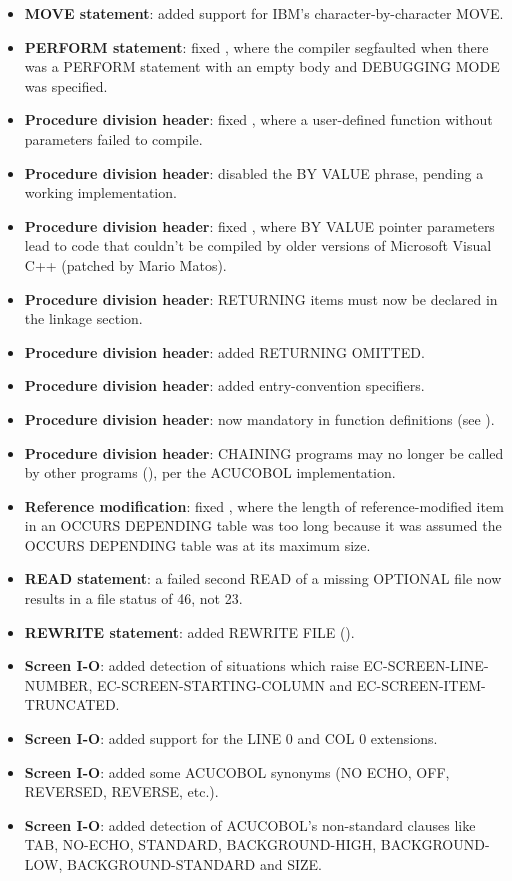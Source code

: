\begin{itemize}
\item \textbf{MOVE statement}: added support for IBM's character-by-character MOVE.
\item \textbf{PERFORM statement}: fixed , where the compiler segfaulted when there was a PERFORM statement with an empty body and DEBUGGING MODE was specified.
\item \textbf{Procedure division header}: fixed , where a user-defined function without parameters failed to compile.
\item \textbf{Procedure division header}: disabled the BY VALUE phrase, pending a working implementation.
\item \textbf{Procedure division header}: fixed , where BY VALUE pointer parameters lead to code that couldn't be compiled by older versions of Microsoft Visual C++ (patched by Mario Matos).
\item \textbf{Procedure division header}: RETURNING items must now be declared in the linkage section.
\item \textbf{Procedure division header}: added RETURNING OMITTED.
\item \textbf{Procedure division header}: added entry-convention specifiers.
\item \textbf{Procedure division header}: now mandatory in function definitions (see ).
\item \textbf{Procedure division header}: CHAINING programs may no longer be called by other programs (), per the ACUCOBOL implementation.
\item \textbf{Reference modification}: fixed , where the length of reference-modified item in an OCCURS DEPENDING table was too long because it was assumed the OCCURS DEPENDING table was at its maximum size.
\item \textbf{READ statement}: a failed second READ of a missing OPTIONAL file now results in a file status of 46, not 23.
\item \textbf{REWRITE statement}: added REWRITE FILE ().
\item \textbf{Screen I-O}: added detection of situations which raise EC-SCREEN-LINE-NUMBER, EC-SCREEN-STARTING-COLUMN and EC-SCREEN-ITEM-TRUNCATED.
\item \textbf{Screen I-O}: added support for the LINE 0 and COL 0 extensions.
\item \textbf{Screen I-O}: added some ACUCOBOL synonyms (NO ECHO, OFF, REVERSED, REVERSE, etc.).
\item \textbf{Screen I-O}: added detection of ACUCOBOL's non-standard clauses like TAB, NO-ECHO, STANDARD, BACKGROUND-HIGH, BACKGROUND-LOW, BACKGROUND-STANDARD and SIZE.

\end{itemize}
